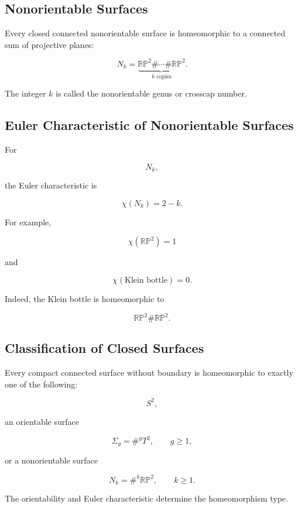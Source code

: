 \subsection{Nonorientable Surfaces}
\label{subsec:nonorientable-surfaces}

Every closed connected nonorientable surface is homeomorphic to a connected
sum of projective planes:

\[
\boxed{
N_k
=
\underbrace{
\mathbb{RP}^2\#\cdots\#\mathbb{RP}^2
}_{k\text{ copies}}.
}
\]

The integer \(k\) is called the nonorientable genus or crosscap number.

\subsection{Euler Characteristic of Nonorientable Surfaces}
\label{subsec:euler-characteristic-nonorientable}

For

\[
N_k,
\]

the Euler characteristic is

\[
\boxed{
\chi(N_k)=2-k.
}
\]

For example,

\[
\chi(\mathbb{RP}^2)=1
\]

and

\[
\chi(\text{Klein bottle})=0.
\]

Indeed, the Klein bottle is homeomorphic to

\[
\boxed{
\mathbb{RP}^2\#\mathbb{RP}^2.
}
\]

\subsection{Classification of Closed Surfaces}
\label{subsec:classification-closed-surfaces}

\begin{theorem}
Every compact connected surface without boundary is homeomorphic to exactly
one of the following:

\[
\boxed{
S^2,
}
\]

an orientable surface

\[
\boxed{
\Sigma_g
=
\#^g T^2,
\qquad
g\geq1,
}
\]

or a nonorientable surface

\[
\boxed{
N_k
=
\#^k\mathbb{RP}^2,
\qquad
k\geq1.
}
\]

The orientability and Euler characteristic determine the homeomorphism type.
\end{theorem}

